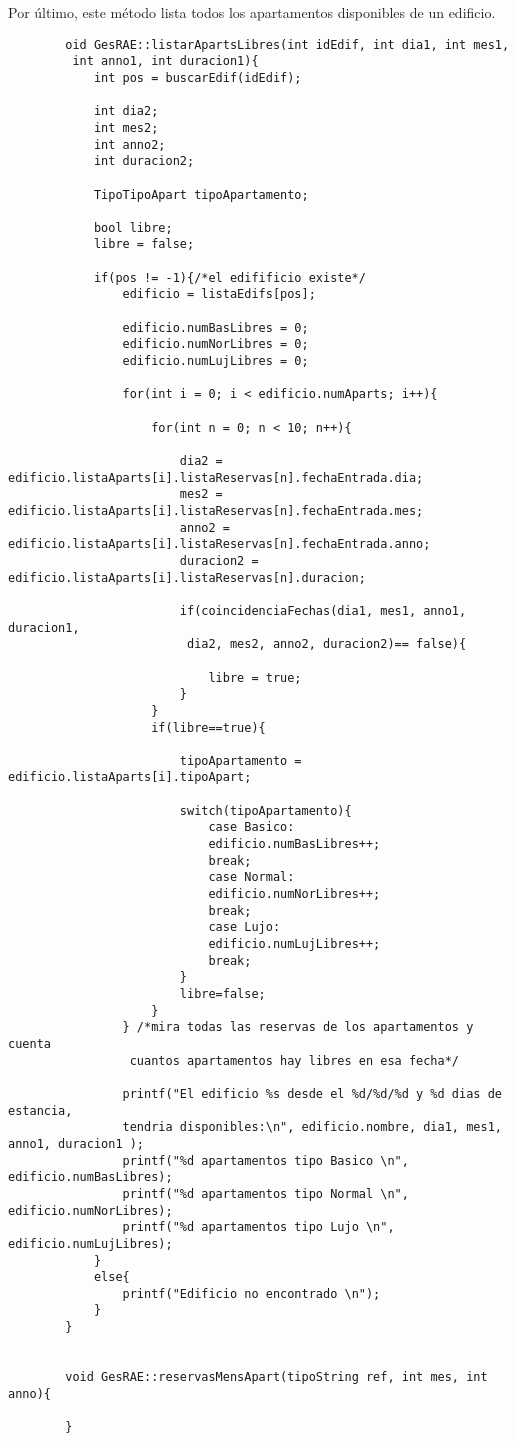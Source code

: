\documentclass[12pt]{article}
\begin{document}
	Por último, este método lista todos los apartamentos disponibles de un edificio.
	\small
	\begin{lstlisting}
		oid GesRAE::listarApartsLibres(int idEdif, int dia1, int mes1,
		 int anno1, int duracion1){
			int pos = buscarEdif(idEdif);
			
			int dia2;
			int mes2;
			int anno2;
			int duracion2;
			
			TipoTipoApart tipoApartamento;
			
			bool libre;
			libre = false;
			
			if(pos != -1){/*el edifificio existe*/
				edificio = listaEdifs[pos];
				
				edificio.numBasLibres = 0;
				edificio.numNorLibres = 0;
				edificio.numLujLibres = 0;
				
				for(int i = 0; i < edificio.numAparts; i++){
					
					for(int n = 0; n < 10; n++){
						
						dia2 = edificio.listaAparts[i].listaReservas[n].fechaEntrada.dia;
						mes2 = edificio.listaAparts[i].listaReservas[n].fechaEntrada.mes;
						anno2 = edificio.listaAparts[i].listaReservas[n].fechaEntrada.anno;
						duracion2 = edificio.listaAparts[i].listaReservas[n].duracion;
						
						if(coincidenciaFechas(dia1, mes1, anno1, duracion1,
						 dia2, mes2, anno2, duracion2)== false){
							
							libre = true;
						}
					}
					if(libre==true){
						
						tipoApartamento = edificio.listaAparts[i].tipoApart;
						
						switch(tipoApartamento){
							case Basico:
							edificio.numBasLibres++;
							break;
							case Normal:
							edificio.numNorLibres++;
							break;
							case Lujo:
							edificio.numLujLibres++;
							break;
						}
						libre=false;
					}
				} /*mira todas las reservas de los apartamentos y cuenta
				 cuantos apartamentos hay libres en esa fecha*/
				
				printf("El edificio %s desde el %d/%d/%d y %d dias de estancia, 
				tendria disponibles:\n", edificio.nombre, dia1, mes1, anno1, duracion1 );
				printf("%d apartamentos tipo Basico \n", edificio.numBasLibres);
				printf("%d apartamentos tipo Normal \n", edificio.numNorLibres);
				printf("%d apartamentos tipo Lujo \n", edificio.numLujLibres);
			}
			else{
				printf("Edificio no encontrado \n");
			}
		}
		
		
		void GesRAE::reservasMensApart(tipoString ref, int mes, int anno){
			
		}
	
		\end{lstlisting}
		
\end{document}
